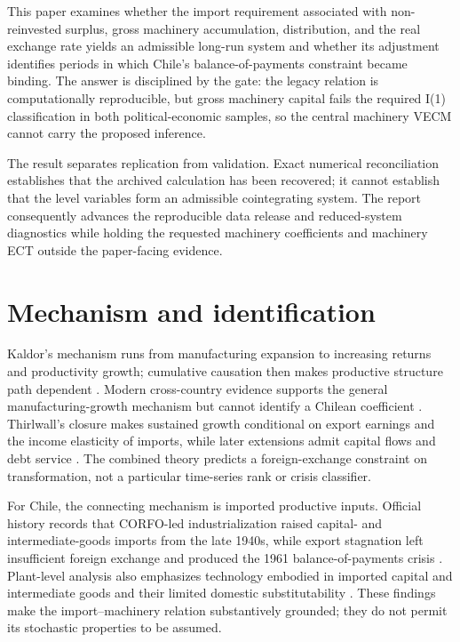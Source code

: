 \documentclass[11pt]{article}
\begin{document}
This paper examines whether the import requirement associated with non-reinvested surplus, gross machinery accumulation, distribution, and the real exchange rate yields an admissible long-run system and whether its adjustment identifies periods in which Chile's balance-of-payments constraint became binding. The answer is disciplined by the gate: the legacy relation is computationally reproducible, but gross machinery capital fails the required I(1) classification in both political-economic samples, so the central machinery VECM cannot carry the proposed inference.

The result separates replication from validation. Exact numerical reconciliation establishes that the archived calculation has been recovered; it cannot establish that the level variables form an admissible cointegrating system. The report consequently advances the reproducible data release and reduced-system diagnostics while holding the requested machinery coefficients and machinery ECT outside the paper-facing evidence.

\FloatBarrier
\section{Mechanism and identification}

Kaldor's mechanism runs from manufacturing expansion to increasing returns and productivity growth; cumulative causation then makes productive structure path dependent \citep{kaldor1967,kaldor1970}. Modern cross-country evidence supports the general manufacturing-growth mechanism but cannot identify a Chilean coefficient \citep{marconi2016}. Thirlwall's closure makes sustained growth conditional on export earnings and the income elasticity of imports, while later extensions admit capital flows and debt service \citep{thirlwall1979,thirlwall1982,morenobrid2003}. The combined theory predicts a foreign-exchange constraint on transformation, not a particular time-series rank or crisis classifier.

For Chile, the connecting mechanism is imported productive inputs. Official history records that CORFO-led industrialization raised capital- and intermediate-goods imports from the late 1940s, while export stagnation left insufficient foreign exchange and produced the 1961 balance-of-payments crisis \citep{bcch2025}. Plant-level analysis also emphasizes technology embodied in imported capital and intermediate goods and their limited domestic substitutability \citep{alvarez2003}. These findings make the import--machinery relation substantively grounded; they do not permit its stochastic properties to be assumed.
\end{document}
